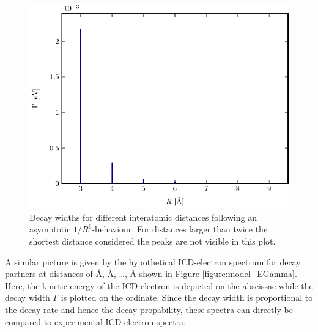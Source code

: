 \begin{figure}[h]
 \centering
 \includegraphics[width=\columnwidth]{pics/model_RGamma.pdf}
 \caption{Decay widths for different interatomic distances following an
          asymptotic $1/R^6$-behaviour. For distances larger than twice
          the shortest distance considered the peaks are not visible in this
          plot.}
 \label{figure:model_RGamma}
\end{figure}

A similar picture is given by the hypothetical ICD-electron spectrum for
decay partners at distances of \unit[3]{\AA}, \unit[4]{\AA}, \dots,
\unit[9]{\AA} shown in Figure \ref{figure:model_EGamma}. Here, the kinetic
energy of the ICD electron is depicted on the abscissae while the decay
width $\Gamma$ is plotted on the ordinate. Since the decay width is proportional
to the decay rate and hence the decay propability, these spectra can directly
be compared to experimental ICD electron spectra.

